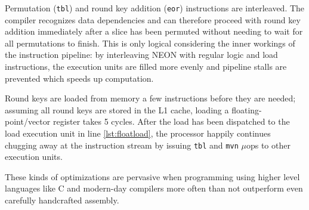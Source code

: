 Permutation (\texttt{tbl}) and round key addition (\texttt{eor}) instructions
are interleaved. The compiler recognizes data dependencies and can therefore
proceed with round key addition immediately after a slice has been permuted
without needing to wait for all permutations to finish. This is only logical
considering the inner workings of the instruction pipeline: by interleaving
NEON with regular logic and load instructions, the execution units are filled
more evenly and pipeline stalls are prevented which speeds up computation.

Round keys are loaded from memory a few instructions before they are needed;
assuming all round keys are stored in the L1 cache, loading a
floating-point/vector register takes 5 cycles. After the load has been
dispatched to the load execution unit in line \ref{lst:floatload}, the
processor happily continues chugging away at the instruction stream by issuing
\texttt{tbl} and \texttt{mvn} $\mu$ops to other execution units.

These kinds of optimizations are pervasive when programming using higher level
languages like C and modern-day compilers more often than not outperform even
carefully handcrafted assembly.
